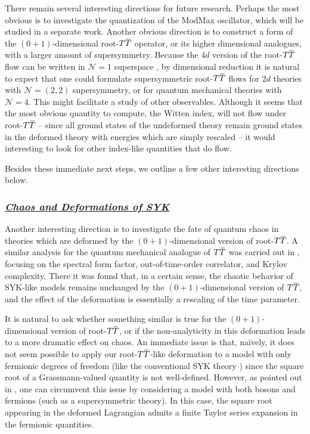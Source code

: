 \documentclass[12pt]{article}
\numberwithin{equation}{section}
\newcommand{\ul}{\underline}
\newcommand{\overbar}[1]{\mkern 1.5mu\overline{\mkern-1.5mu#1\mkern-1.5mu}\mkern 1.5mu}
\def\TT{{T\overbar{T}}}
\begin{document}
There remain several interesting directions for future research. Perhaps the most obvious is to investigate the quantization of the ModMax oscillator, which will be studied in a separate work. Another obvious direction is to construct a form of the $(0+1)$-dimensional root-$\TT$ operator, or its higher dimensional analogues, with a larger amount of supersymmetry. Because the $4d$ version of the root-$\TT$ flow can be written in $\mathcal{N} = 1$ superspace \cite{Ferko:2023ruw}, by dimensional reduction it is natural to expect that one could formulate supersymmetric root-$\TT$ flows for $2d$ theories with $\mathcal{N} = (2, 2)$ supersymmetry, or for quantum mechanical theories with $\mathcal{N} = 4$. This might facilitate a study of other observables. Although it seems that the most obvious quantity to compute, the Witten index, will not flow under root-$\TT$ -- since all ground states of the undeformed theory remain ground states in the deformed theory with energies which are simply rescaled -- it would interesting to look for other index-like quantities that do flow.

Besides these immediate next steps, we outline a few other interesting directions below.

\subsubsection*{\ul{\it Chaos and Deformations of SYK}}

Another interesting direction is to investigate the fate of quantum chaos in theories which are deformed by the $(0+1)$-dimensional version of root-$\TT$. A similar analysis for the quantum mechanical analogue of $\TT$ was carried out in \cite{He:2022ryk}, focusing on the spectral form factor, out-of-time-order correlator, and Krylov complexity. There it was found that, in a certain sense, the chaotic behavior of SYK-like models remains unchanged by the $(0+1)$-dimensional version of $\TT$, and the effect of the deformation is essentially a rescaling of the time parameter. 

It is natural to ask whether something similar is true for the $(0+1)$-dimensional version of root-$\TT$, or if the non-analyticity in this deformation leads to a more dramatic effect on chaos. An immediate issue is that, na\"ively, it does not seem possible to apply our root-$\TT$-like deformation to a model with only fermionic degrees of freedom (like the conventional SYK theory \cite{kitaev_talk,PhysRevLett.70.3339}) since the square root of a Grassmann-valued quantity is not well-defined. However, as pointed out in \cite{Ferko:2022cix}, one can circumvent this issue by considering a model with both bosons and fermions (such as a supersymmetric theory). In this case, the square root appearing in the deformed Lagrangian admits a finite Taylor series expansion in the fermionic quantities.
\end{document}
